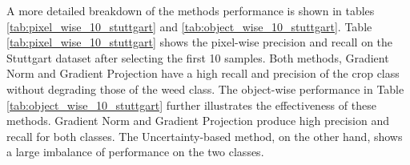 \documentclass[letterpaper, 10 pt, conference]{ieeeconf}  %
\begin{document}
 

    

   
   
%   
   
   
A more detailed breakdown of the methods performance is shown in tables \ref{tab:pixel_wise_10_stuttgart} and \ref{tab:object_wise_10_stuttgart}. Table \ref{tab:pixel_wise_10_stuttgart} shows the pixel-wise precision and recall on the Stuttgart dataset after selecting the first 10 samples. Both methods, Gradient Norm and Gradient Projection have a high recall and precision of the crop class without degrading those of the weed class. The object-wise performance in Table \ref{tab:object_wise_10_stuttgart} further illustrates the effectiveness of these methods. Gradient Norm and Gradient Projection produce high precision and recall for both classes. The Uncertainty-based method, on the other hand, shows a large imbalance of performance on the two classes.
   
   
   
\end{document}
